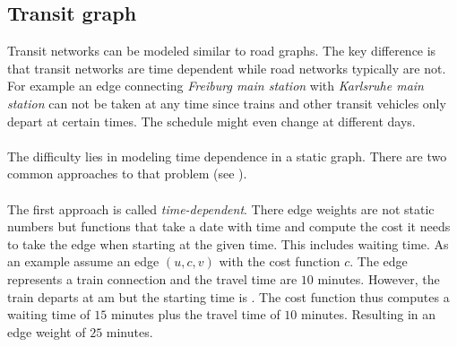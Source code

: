 \subsection{Transit graph}\label{transitGraph}
	Transit networks can be modeled similar to road graphs. The key difference is that transit networks are time dependent
	while road networks typically are not. For example an edge connecting \textit{Freiburg main station} with \textit{Karlsruhe main station}
	can not be taken at any time since trains and other transit vehicles only depart at certain times. The schedule might even change
	at different days.\\\\
	The difficulty lies in modeling time dependence in a static graph. There are two common approaches to that problem
	(see ).\\\\
	The first approach is called \textit{time-dependent}. There edge weights are not static numbers but functions that take a
	date with time and compute the cost it needs to take the edge when starting at the given time.
	This includes waiting time. As an example assume an edge $(u, c, v)$ with the cost function $c$. The edge represents a
	train connection and the travel time are $10$ minutes. However, the train departs at  am but the starting time
	is . The cost function thus computes a waiting time of $15$ minutes plus the travel time of $10$ minutes.
	Resulting in an edge weight of $25$ minutes.
	
